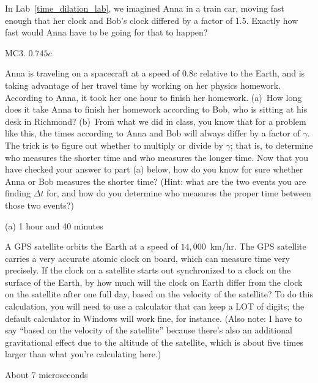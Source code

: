 \begin{Exercise}
In  Lab~\ref{time_dilation_lab}, we imagined Anna in a train car, moving fast enough that her clock and Bob's clock differed by a factor of 1.5.  Exactly how fast would Anna have to be going for that to happen? 
\end{Exercise}
\begin{Answer}
MC3. $0.745c$
\end{Answer}


\begin{Exercise}
Anna is traveling on a spacecraft at a speed of $0.8c$ relative to the Earth, and is taking advantage of her travel time by working on her physics homework.  According to Anna, it took her one hour to finish her homework.  (a)~How long does it take Anna to finish her homework according to Bob, who is sitting at his desk in Richmond? (b)~From what we did in class, you know that for a problem like this, the times according to Anna and Bob will always differ by a factor of $\gamma$.  The trick is to figure out whether to multiply or divide by $\gamma$; that is, to determine who measures the shorter time and who measures the longer time.  Now that you have checked your answer to part (a) below, how do you know for sure whether Anna or Bob measures the shorter time?  (Hint: what are the two events you are finding $\Delta t$ for, and how do you determine who measures the proper time between those two events?)
\label{anna_bob_hw1}
\end{Exercise}
\begin{Answer}
(a) 1 hour and 40 minutes
\end{Answer}


\begin{Exercise}
A GPS satellite orbits the Earth at a speed of $14,000$~km/hr.  The GPS satellite carries a very accurate atomic clock on board, which can measure time very precisely.  If the clock on a satellite starts out synchronized to a clock on the surface of the Earth, by how much will the clock on Earth differ from the clock on the satellite after one full day, based on the velocity of the satellite?  To do this calculation, you will need to use a calculator that can keep a LOT of digits; the default calculator in Windows will work fine, for instance.  (Also note: I have to say ``based on the velocity of the satellite'' because there's also an additional gravitational effect due to the altitude of the satellite, which is about five times larger than what you're calculating here.) 
\end{Exercise}
\begin{Answer}
About 7 microseconds
\end{Answer}


